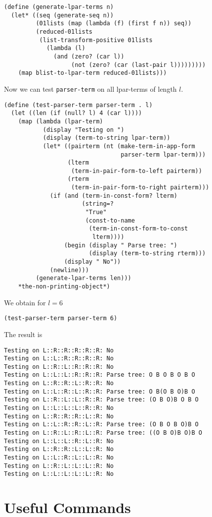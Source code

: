 \documentclass[12pt]{amsart}
\begin{document}
\begin{appendix}
\begin{verbatim}
(define (generate-lpar-terms n)
  (let* ((seq (generate-seq n))
         (01lists (map (lambda (f) (first f n)) seq))
         (reduced-01lists
          (list-transform-positive 01lists
            (lambda (l)
              (and (zero? (car l))
                   (not (zero? (car (last-pair l)))))))))
    (map blist-to-lpar-term reduced-01lists)))
\end{verbatim}
Now we can test \texttt{parser-term} on all lpar-terms of length $l$. 
\begin{verbatim}
(define (test-parser-term parser-term . l)
  (let ((len (if (null? l) 4 (car l))))
    (map (lambda (lpar-term)
           (display "Testing on ")
           (display (term-to-string lpar-term))
           (let* ((pairterm (nt (make-term-in-app-form
                                 parser-term lpar-term)))
                  (lterm
                   (term-in-pair-form-to-left pairterm))
                  (rterm
                   (term-in-pair-form-to-right pairterm)))
             (if (and (term-in-const-form? lterm)
                      (string=?
                       "True"
                       (const-to-name
                        (term-in-const-form-to-const
                         lterm))))
                 (begin (display " Parse tree: ")
                        (display (term-to-string rterm)))
                 (display " No"))
             (newline)))
         (generate-lpar-terms len)))
    *the-non-printing-object*)
\end{verbatim}
We obtain for $l=6$
\begin{verbatim}
(test-parser-term parser-term 6)
\end{verbatim}
The result is
\begin{verbatim}
Testing on L::R::R::R::R::R: No
Testing on L::L::R::R::R::R: No
Testing on L::R::L::R::R::R: No
Testing on L::L::L::R::R::R: Parse tree: O B O B O B O
Testing on L::R::R::L::R::R: No
Testing on L::L::R::L::R::R: Parse tree: O B(O B O)B O
Testing on L::R::L::L::R::R: Parse tree: (O B O)B O B O
Testing on L::L::L::L::R::R: No
Testing on L::R::R::R::L::R: No
Testing on L::L::R::R::L::R: Parse tree: (O B O B O)B O
Testing on L::R::L::R::L::R: Parse tree: ((O B O)B O)B O
Testing on L::L::L::R::L::R: No
Testing on L::R::R::L::L::R: No
Testing on L::L::R::L::L::R: No
Testing on L::R::L::L::L::R: No
Testing on L::L::L::L::L::R: No
\end{verbatim}

\section{Useful Commands}
\label{S:Commands}

\end{appendix}
\end{document}

